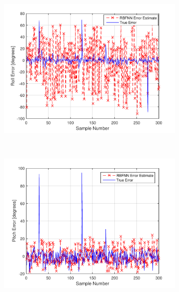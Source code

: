 \begin{figure}
  \begin{subfigure}{0.3\textwidth}
    \includegraphics[width=\textwidth]{figures/chapter4/roll_valid}
    \caption{}
  \end{subfigure}
~
  \begin{subfigure}{0.3\textwidth}
    \includegraphics[width=\textwidth]{figures/chapter4/pitch_valid}
    \caption{}
  \end{subfigure}
~
  \begin{subfigure}{0.3\textwidth}

\end{subfigure}
\end{figure}
